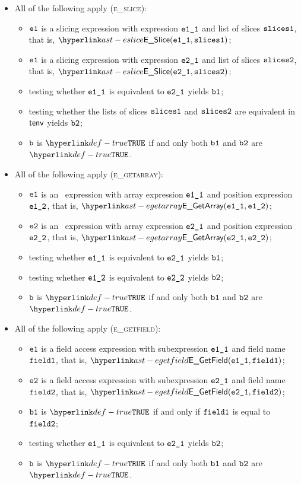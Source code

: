 \begin{itemize}
  \item All of the following apply (\textsc{e\_slice}):
  \begin{itemize}
    \item $\texttt{e1}$ is a slicing expression with expression $\texttt{e1\_1}$ and list of slices $\texttt{slices1}$,
          that is, $\ESlice(\veoneone, \slicesone)$;
    \item $\texttt{e1}$ is a slicing expression with expression $\texttt{e2\_1}$ and list of slices $\texttt{slices2}$,
          that is, $\ESlice(\vetwoone, \slicestwo)$;
    \item testing whether $\texttt{e1\_1}$ is equivalent to $\texttt{e2\_1}$ yields $\texttt{b1}$\ProseOrTypeError;
    \item testing whether the lists of slices $\texttt{slices1}$ and $\texttt{slices2}$ are equivalent in $\textsf{tenv}$ yields $\texttt{b2}$\ProseOrTypeError;
    \item $\texttt{b}$ is $\True$ if and only both $\texttt{b1}$ and $\texttt{b2}$ are $\True$.
  \end{itemize}

  \item All of the following apply (\textsc{e\_getarray}):
  \begin{itemize}
    \item $\texttt{e1}$ is an \arrayaccess\ expression with array expression $\texttt{e1\_1}$ and position expression $\texttt{e1\_2}$,
          that is, $\EGetArray(\veoneone, \veonetwo)$;
    \item $\texttt{e2}$ is an \arrayaccess\ expression with array expression $\texttt{e2\_1}$ and position expression $\texttt{e2\_2}$,
          that is, $\EGetArray(\vetwoone, \vetwotwo)$;
    \item testing whether $\texttt{e1\_1}$ is equivalent to $\texttt{e2\_1}$ yields $\texttt{b1}$\ProseOrTypeError;
    \item testing whether $\texttt{e1\_2}$ is equivalent to $\texttt{e2\_2}$ yields $\texttt{b2}$\ProseOrTypeError;
    \item $\texttt{b}$ is $\True$ if and only both $\texttt{b1}$ and $\texttt{b2}$ are $\True$.
  \end{itemize}

  \item All of the following apply (\textsc{e\_getfield}):
  \begin{itemize}
    \item $\texttt{e1}$ is a field access expression with subexpression $\texttt{e1\_1}$ and field name $\texttt{field1}$,
          that is, $\EGetField(\veoneone, \vfieldone)$;
    \item $\texttt{e2}$ is a field access expression with subexpression $\texttt{e2\_1}$ and field name $\texttt{field2}$,
          that is, $\EGetField(\vetwoone, \vfieldtwo)$;
    \item $\texttt{b1}$ is $\True$ if and only if $\texttt{field1}$ is equal to $\texttt{field2}$;
    \item testing whether $\texttt{e1\_1}$ is equivalent to $\texttt{e2\_1}$ yields $\texttt{b2}$\ProseOrTypeError;
    \item $\texttt{b}$ is $\True$ if and only both $\texttt{b1}$ and $\texttt{b2}$ are $\True$.
  \end{itemize}


\end{itemize}
